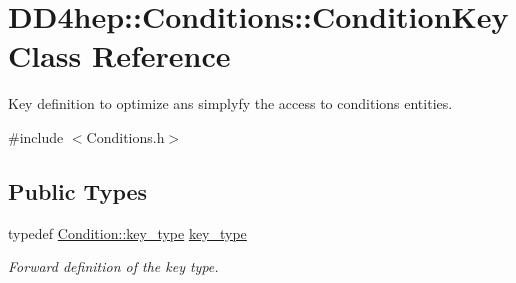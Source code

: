 \hypertarget{class_d_d4hep_1_1_conditions_1_1_condition_key}{
\section{DD4hep::Conditions::ConditionKey Class Reference}
\label{class_d_d4hep_1_1_conditions_1_1_condition_key}
}


Key definition to optimize ans simplyfy the access to conditions entities.  


{\ttfamily \#include $<$Conditions.h$>$}\subsection*{Public Types}
\begin{DoxyCompactItemize}
\item 
typedef \hyperlink{class_d_d4hep_1_1_conditions_1_1_condition_a7528efa762e8cc072ef80ea67c3531f9}{Condition::key\_\-type} \hyperlink{class_d_d4hep_1_1_conditions_1_1_condition_key_a08bfc8ccb807bdd5e4d9f3b065d1c8f5}{key\_\-type}
\begin{DoxyCompactList}\small\item\em Forward definition of the key type. \item\end{DoxyCompactList}\end{DoxyCompactItemize}

